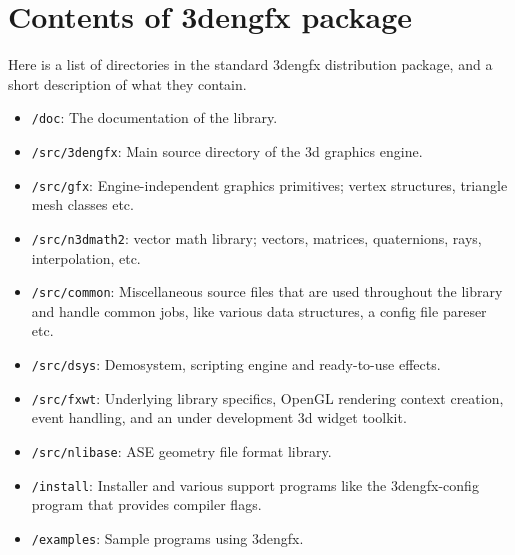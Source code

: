 \chapter{Contents of 3dengfx package}

Here is a list of directories in the standard 3dengfx distribution package, and
a short description of what they contain.

\begin{itemize}

\item \verb|/doc|: The documentation of the library.

\item \verb|/src/3dengfx|: Main source directory of the 3d graphics engine.

\item \verb|/src/gfx|: Engine-independent graphics primitives; vertex
structures, triangle mesh classes etc.

\item \verb|/src/n3dmath2|: vector math library; vectors, matrices, quaternions,
rays, interpolation, etc.

\item \verb|/src/common|: Miscellaneous source files that are used throughout
the library and handle common jobs, like various data structures, a config file
pareser etc.

\item \verb|/src/dsys|: Demosystem, scripting engine and ready-to-use effects.

\item \verb|/src/fxwt|: Underlying library specifics, OpenGL rendering context
creation, event handling, and an under development 3d widget toolkit.

\item \verb|/src/nlibase|: ASE geometry file format library.

\item \verb|/install|: Installer and various support programs like the
3dengfx-config program that provides compiler flags.

\item \verb|/examples|: Sample programs using 3dengfx.

\end{itemize}
